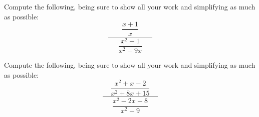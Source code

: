 \documentclass[11pt,letterpaper]{article}
\begin{document}
\newpage





 Compute the following, being sure to show all your work and simplifying as much as possible:
	\[
	\dfrac{\phantom{.}\;\;\;\;\;\;\dfrac{x + 1}{x}\;\;\;\;\;\;\phantom{.}}{\dfrac{x^2 - 1}{x^2 + 9x}}
	\]





\newpage





 Compute the following, being sure to show all your work and simplifying as much as possible:
	\[
	\dfrac{\phantom{.}\;\;\;\dfrac{x^2 + x - 2}{x^2 + 8x + 15}\;\;\;\phantom{.}}{\dfrac{x^2 - 2x - 8}{x^2 - 9}}
	\]





\end{document}
